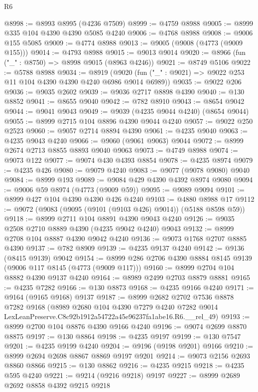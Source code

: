 \begin{lexlean}{R6}
\begin{coremodule}
@8998 := @8993 @8995 (@4236 @7509)
@8999 := @4759 @8988
@9005 := @8999 @335 @104 @4390 @4390 @5085 @4240
@9006 := @4768 @8988
@9008 := @9006 @155 @5085
@9009 := @4774 @8988
@9013 := @9005 (@9008 (@4773 (@9009 @155)))
@9014 := @4793 @8988
@9015 := @9013 @9014
@9020 := @8966 (fun ("_" : @8750) => @8998 @9015 (@8963 @4246))
@9021 := @8749 @5106
@9022 := @5788 @8988
@9034 := @8919
    (@9020 (fun ("_" : @9021) => @9022 @253 @11 @104 @4390 @4390 @4240 @6986 @9014 @6989))
@9035 := @9022 @206
@9036 := @9035 @2602
@9039 := @9036 @2717 @8898 @4390
@9040 := @130 @8852
@9041 := @8655 @9040
@9042 := @782 @8910
@9043 := @8654 @9042
@9044 := @9041 @9043
@9049 := @9039 (@4235 @9044 @4240) (@8654 @9044)
@9055 := @8999 @2715 @104 @8896 @4390 @9044 @4240
@9057 := @9022 @250 @2523
@9060 := @9057 @2714 @8894 @4390
@9061 := @4235 @9040
@9063 := @4235 @9043 @4240
@9066 := @9060 (@9061 @9063) @9044
@9072 := @8999 @2674 @2713 @8855 @8893 @9040 @9063
@9073 := @4749 @8988
@9074 := @9073 @122
@9077 := @9074 @430 @4393 @8854
@9078 := @4235 @8974
@9079 := @4235 @426
@9080 := @9079 @4240
@9083 := @9077 (@9078 @9080) @9040
@9084 := @8999 @193
@9089 := @9084 @429 @4390 @4392 @8974 @9080
@9094 := @9006 @59 @8974 (@4773 (@9009 @59))
@9095 := @9089 @9094
@9101 := @8999 @427 @104 @4390 @4390 @426 @4240
@9103 := @4880 @8988 @17
@9112 := @9072 (@9083 (@9095 (@9101 (@9103 @426) @9014)) (@5188 @8598 @59))
@9118 := @8999 @2711 @104 @8891 @4390 @9043 @4240
@9126 := @9035 @2508 @2710 @8889 @4390 (@4235 @9042 @4240) @9043
@9132 := @8999 @2708 @104 @8887 @4390 @9042 @4240
@9136 := @9073 @1768 @2707 @8885 @4390
@9137 := @782 @8909
@9139 := @4235 @9137 @4240
@9142 := @9136 (@8415 @9139) @9042
@9154 := @8999 @286 @2706 @4390 @8884 @8145 @9139 (@9006 @117 @8145 (@4773 (@9009 @117)))
@9160 := @8999 @2704 @104 @8882 @4390 @9137 @4240
@9164 := @8989 @2499 @2703 @8879 @8881
@9165 := @4235 @7282
@9166 := @130 @8873
@9168 := @4235 @9166 @4240
@9171 := @9164 (@9165 @9168) @9137
@9187 := @8999
    @2682
    @2702
    @7536
    @8878
    @7282
    @9168
    (@8989
      @2680
      @104
      @4390
      @7279
      @4240
      @7282
      @9014
      LexLeanPreserve.C8c92b1912a54722a45e96237fa1abe16.R6.__rel_49)
@9193 := @8999 @2700 @104 @8876 @4390 @9166 @4240
@9196 := @9074 @2699 @8870 @8875
@9197 := @130 @8864
@9198 := @4235 @9197
@9199 := @130 @7547
@9201 := @4235 @9199 @4240
@9204 := @9196 (@9198 @9201) @9166
@9210 := @8999 @2694 @2698 @8867 @8869 @9197 @9201
@9214 := @9073 @2156 @2693 @8860 @8866
@9215 := @130 @8862
@9216 := @4235 @9215
@9218 := @4235 @595 @4240
@9221 := @9214 (@9216 @9218) @9197
@9227 := @8999 @2689 @2692 @8858 @4392 @9215 @9218

\end{coremodule}
\end{lexlean}
